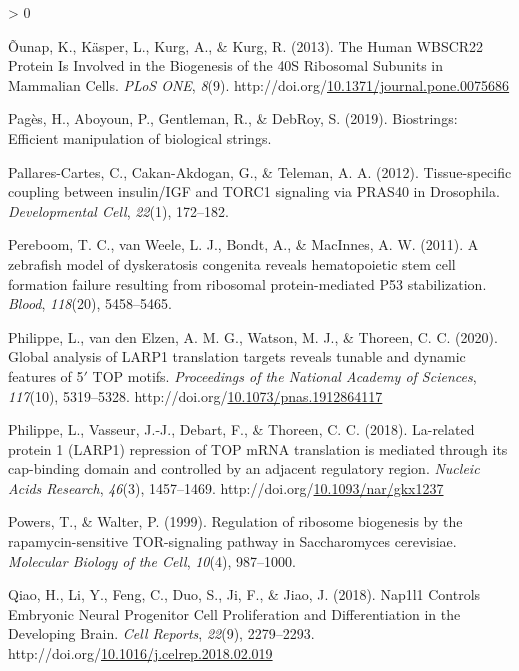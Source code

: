 \documentclass[12pt,oneside]{reedthesis}
\newlength{\cslhangindent}
\newenvironment{CSLReferences}[2] %
 {%
  \setlength{\parindent}{0pt}
  \ifodd #1 \everypar{\setlength{\hangindent}{\cslhangindent}}\ignorespaces\fi
  \ifnum #2 > 0
  \setlength{\parskip}{#2\baselineskip}
  \fi
 }%
 {}
\begin{document}
\begin{CSLReferences}{1}{0}
\leavevmode\hypertarget{ref-ounapHumanWBSCR22Protein2013}{}%
Õunap, K., Käsper, L., Kurg, A., \& Kurg, R. (2013). The {Human WBSCR22 Protein Is Involved} in the {Biogenesis} of the {40S Ribosomal Subunits} in {Mammalian Cells}. \emph{PLoS ONE}, \emph{8}(9). http://doi.org/\href{https://doi.org/10.1371/journal.pone.0075686}{10.1371/journal.pone.0075686}

\leavevmode\hypertarget{ref-pagesBiostringsEfficientManipulation2019}{}%
Pagès, H., Aboyoun, P., Gentleman, R., \& DebRoy, S. (2019). Biostrings: {Efficient} manipulation of biological strings.

\leavevmode\hypertarget{ref-Pallares-Cartes2012a}{}%
Pallares-Cartes, C., Cakan-Akdogan, G., \& Teleman, A. A. (2012). Tissue-specific coupling between insulin/{IGF} and {TORC1} signaling via {PRAS40} in {Drosophila}. \emph{Developmental Cell}, \emph{22}(1), 172--182.

\leavevmode\hypertarget{ref-Pereboom2011a}{}%
Pereboom, T. C., van Weele, L. J., Bondt, A., \& MacInnes, A. W. (2011). A zebrafish model of dyskeratosis congenita reveals hematopoietic stem cell formation failure resulting from ribosomal protein-mediated P53 stabilization. \emph{Blood}, \emph{118}(20), 5458--5465.

\leavevmode\hypertarget{ref-philippeGlobalAnalysisLARP12020}{}%
Philippe, L., van den Elzen, A. M. G., Watson, M. J., \& Thoreen, C. C. (2020). Global analysis of {LARP1} translation targets reveals tunable and dynamic features of 5{\({'}\)} {TOP} motifs. \emph{Proceedings of the National Academy of Sciences}, \emph{117}(10), 5319--5328. http://doi.org/\href{https://doi.org/10.1073/pnas.1912864117}{10.1073/pnas.1912864117}

\leavevmode\hypertarget{ref-philippeLarelatedProteinLARP12018}{}%
Philippe, L., Vasseur, J.-J., Debart, F., \& Thoreen, C. C. (2018). La-related protein 1 ({LARP1}) repression of {TOP mRNA} translation is mediated through its cap-binding domain and controlled by an adjacent regulatory region. \emph{Nucleic Acids Research}, \emph{46}(3), 1457--1469. http://doi.org/\href{https://doi.org/10.1093/nar/gkx1237}{10.1093/nar/gkx1237}

\leavevmode\hypertarget{ref-powersRegulationRibosomeBiogenesis1999}{}%
Powers, T., \& Walter, P. (1999). Regulation of ribosome biogenesis by the rapamycin-sensitive {TOR-signaling} pathway in {Saccharomyces} cerevisiae. \emph{Molecular Biology of the Cell}, \emph{10}(4), 987--1000.

\leavevmode\hypertarget{ref-qiaoNap1l1ControlsEmbryonic2018}{}%
Qiao, H., Li, Y., Feng, C., Duo, S., Ji, F., \& Jiao, J. (2018). Nap1l1 {Controls Embryonic Neural Progenitor Cell Proliferation} and {Differentiation} in the {Developing Brain}. \emph{Cell Reports}, \emph{22}(9), 2279--2293. http://doi.org/\href{https://doi.org/10.1016/j.celrep.2018.02.019}{10.1016/j.celrep.2018.02.019}


\end{CSLReferences}
\end{document}
